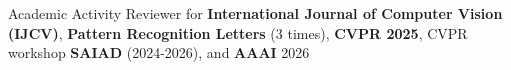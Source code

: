 \begin{rubric}{Academic Activity}
	Reviewer for \textbf{International Journal of Computer Vision (IJCV)}, \textbf{Pattern Recognition Letters} (3 times), \textbf{CVPR 2025}, CVPR workshop \textbf{SAIAD} (2024-2026), and \textbf{AAAI} 2026
\end{rubric}
